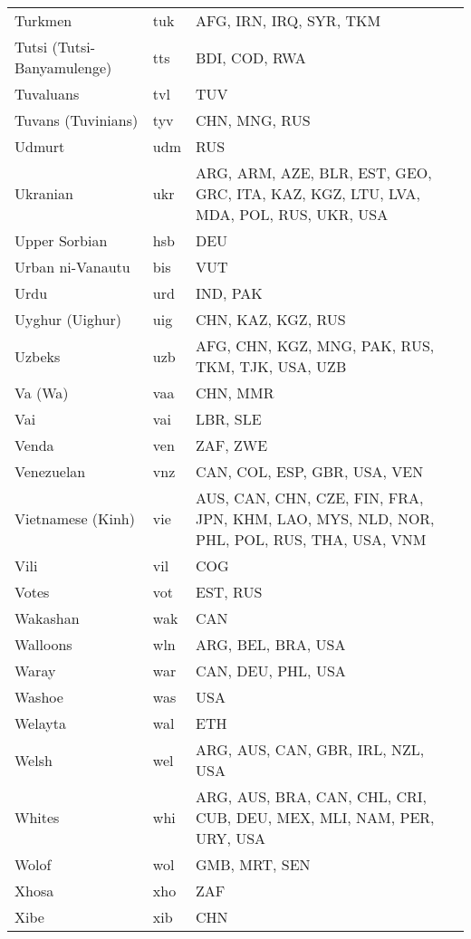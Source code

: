 \documentclass[12pt]{article}
\begin{document}
\begin{center}
\begin{longtable}{|p{7cm}|p{1cm}|p{7cm}|}
Turkmen	&	tuk 	&	AFG, IRN, IRQ, SYR, TKM	\\	\cline{1-3}
Tutsi (Tutsi-Banyamulenge)	&	tts	&	BDI, COD, RWA	\\	\cline{1-3}
Tuvaluans	&	tvl 	&	TUV	\\	\cline{1-3}
Tuvans (Tuvinians)	&	tyv 	&	CHN, MNG, RUS	\\	\cline{1-3}
Udmurt	&	udm 	&	RUS	\\	\cline{1-3}
Ukranian	&	ukr 	&	ARG, ARM, AZE, BLR, EST, GEO, GRC, ITA, KAZ, KGZ, LTU, LVA, MDA, POL, RUS, UKR, USA	\\	 \cline{1-3}
Upper Sorbian	&	hsb 	&	DEU	\\	\cline{1-3}
Urban ni-Vanautu	&	bis 	&	VUT	\\	\cline{1-3}
Urdu	&	urd 	&	IND, PAK	\\	\cline{1-3}
Uyghur (Uighur)	&	uig 	&	CHN, KAZ, KGZ, RUS	\\	\cline{1-3}
Uzbeks	&	uzb 	&	AFG, CHN, KGZ, MNG, PAK, RUS, TKM, TJK, USA, UZB	\\	\cline{1-3}
Va (Wa)	&	vaa	&	CHN, MMR	\\	\cline{1-3}
Vai	&	vai 	&	LBR, SLE	\\	\cline{1-3}
Venda	&	ven 	&	ZAF, ZWE	\\	\cline{1-3}
Venezuelan	&	vnz	&	CAN, COL, ESP, GBR, USA, VEN	\\	\cline{1-3}
Vietnamese (Kinh)	&	vie 	&	AUS, CAN, CHN, CZE, FIN, FRA, JPN, KHM, LAO, MYS, NLD, NOR, PHL, POL, RUS, THA, USA, VNM	\\	\cline{1-3}
Vili	&	vil	&	COG	\\	\cline{1-3}
Votes	&	vot 	&	EST, RUS	\\	\cline{1-3}
Wakashan	&	wak 	&	CAN	\\	\cline{1-3}
Walloons	&	wln 	&	ARG, BEL, BRA, USA	\\	\cline{1-3}
Waray	&	war 	&	CAN, DEU, PHL, USA	\\	\cline{1-3}
Washoe	&	was 	&	USA	\\	\cline{1-3}
Welayta	&	wal 	&	ETH	\\	\cline{1-3}
Welsh	&	wel	&	ARG, AUS, CAN, GBR, IRL, NZL, USA	\\	\cline{1-3}
Whites	&	whi	&	ARG, AUS, BRA, CAN, CHL, CRI, CUB, DEU, MEX, MLI, NAM, PER, URY, USA	\\	\cline{1-3}
Wolof	&	wol 	&	GMB, MRT, SEN	\\	\cline{1-3}
Xhosa	&	xho 	&	ZAF	\\	\cline{1-3}
Xibe	&	xib	&	CHN	\\	\cline{1-3}

\end{longtable}
\end{center}
\end{document}
